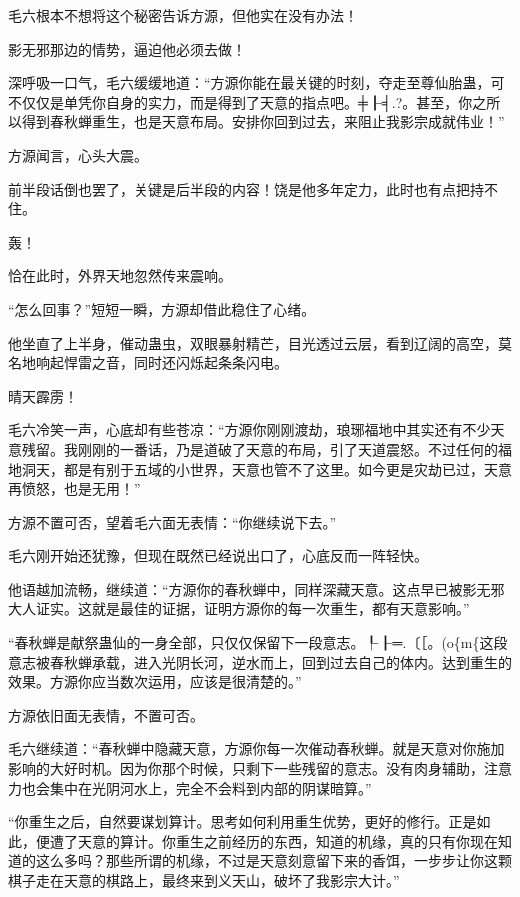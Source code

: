 
\begin{this_body}

毛六根本不想将这个秘密告诉方源，但他实在没有办法！

影无邪那边的情势，逼迫他必须去做！

深呼吸一口气，毛六缓缓地道：“方源你能在最关键的时刻，夺走至尊仙胎蛊，可不仅仅是单凭你自身的实力，而是得到了天意的指点吧。╪┠╡.?。甚至，你之所以得到春秋蝉重生，也是天意布局。安排你回到过去，来阻止我影宗成就伟业！”

方源闻言，心头大震。

前半段话倒也罢了，关键是后半段的内容！饶是他多年定力，此时也有点把持不住。

轰！

恰在此时，外界天地忽然传来震响。

“怎么回事？”短短一瞬，方源却借此稳住了心绪。

他坐直了上半身，催动蛊虫，双眼暴射精芒，目光透过云层，看到辽阔的高空，莫名地响起悍雷之音，同时还闪烁起条条闪电。

晴天霹雳！

毛六冷笑一声，心底却有些苍凉：“方源你刚刚渡劫，琅琊福地中其实还有不少天意残留。我刚刚的一番话，乃是道破了天意的布局，引了天道震怒。不过任何的福地洞天，都是有别于五域的小世界，天意也管不了这里。如今更是灾劫已过，天意再愤怒，也是无用！”

方源不置可否，望着毛六面无表情：“你继续说下去。”

毛六刚开始还犹豫，但现在既然已经说出口了，心底反而一阵轻快。

他语越加流畅，继续道：“方源你的春秋蝉中，同样深藏天意。这点早已被影无邪大人证实。这就是最佳的证据，证明方源你的每一次重生，都有天意影响。”

“春秋蝉是献祭蛊仙的一身全部，只仅仅保留下一段意志。┞┠═.〔［。(o\{m\{这段意志被春秋蝉承载，进入光阴长河，逆水而上，回到过去自己的体内。达到重生的效果。方源你应当数次运用，应该是很清楚的。”

方源依旧面无表情，不置可否。

毛六继续道：“春秋蝉中隐藏天意，方源你每一次催动春秋蝉。就是天意对你施加影响的大好时机。因为你那个时候，只剩下一些残留的意志。没有肉身辅助，注意力也会集中在光阴河水上，完全不会料到内部的阴谋暗算。”

“你重生之后，自然要谋划算计。思考如何利用重生优势，更好的修行。正是如此，便遭了天意的算计。你重生之前经历的东西，知道的机缘，真的只有你现在知道的这么多吗？那些所谓的机缘，不过是天意刻意留下来的香饵，一步步让你这颗棋子走在天意的棋路上，最终来到义天山，破坏了我影宗大计。”


\end{this_body}
